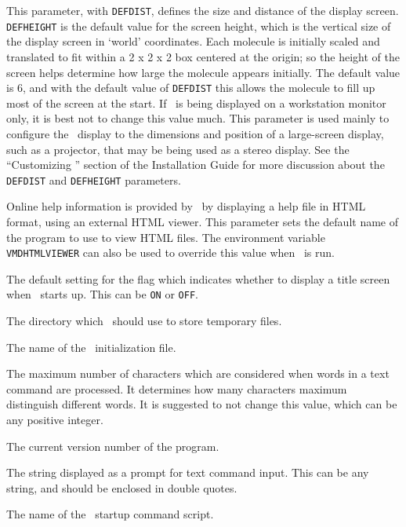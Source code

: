 \begin{itemize}
This parameter, with {\tt DEFDIST}, defines the size and distance of the
display screen.  {\tt DEFHEIGHT} is the default value for the screen height,
which is the vertical size of the display screen in `world' coordinates.  Each
molecule is initially scaled and translated to fit within a 2 x 2 x 2 box
centered at the origin; so the height of the screen helps determine how large
the molecule appears initially.  The default value is 6, and with the default
value of {\tt DEFDIST} this allows the molecule to fill up most of the screen
at the start.  If \VMD\ is being displayed on a workstation monitor only, it
is best not to change this value much.  This parameter is used mainly to configure the \VMD\ display to the dimensions and position of a large-screen display, such as a projector, that may be being used as a stereo display.
See the ``Customizing \VMD'' section of the Installation Guide for more discussion about the {\tt DEFDIST} and {\tt DEFHEIGHT} parameters.

Online help information is provided by \VMD\ by displaying a help file in HTML format, using an external HTML viewer.  This parameter sets the default name of the program to use to view HTML files.  The environment variable {\tt VMDHTMLVIEWER} can also be used to override this value when \VMD\ is run.

The default setting for the flag
which indicates whether to display a title screen when \VMD\ starts
up.  This can be {\tt ON} or {\tt OFF}.

The directory which \VMD\ should use to store temporary files.

The name of the \VMD\ initialization file.

The maximum number of characters which are considered when words in a text
command are processed.  It determines how many characters maximum distinguish
different words.  It is suggested to not change this value, which can be any
positive integer.

The current version number of the program.

The string displayed as a prompt for text command input.  This can be any string, and should be enclosed in double quotes.

The name of the \VMD\ startup command script.

\end{itemize}


